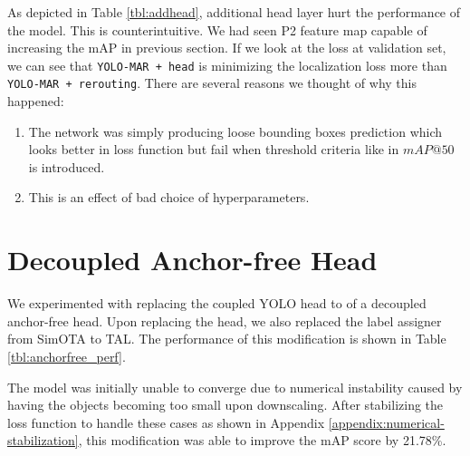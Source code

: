 \begin{table}
  \centering
  \label{tbl:addhead}
  \vspace{-1ex}
  
\end{table}

As depicted in Table \ref{tbl:addhead}, additional head layer hurt the performance of the model.
This is counterintuitive. We had seen P2 feature map capable of increasing the mAP in previous section.
If we look at the loss at validation set, we can see that \verb|YOLO-MAR + head| is 
minimizing the localization loss more than \verb|YOLO-MAR + rerouting|.
There are several reasons we thought of why this happened:
\begin{enumerate}
  \item The network was simply producing loose bounding boxes prediction which looks better in loss function
  but fail when threshold criteria like in $mAP@50$ is introduced.

  \item This is an effect of bad choice of hyperparameters.
\end{enumerate}


\section{Decoupled Anchor-free Head}
We experimented with replacing the coupled YOLO head to of a decoupled anchor-free head.
Upon replacing the head, we also replaced the label assigner from SimOTA to TAL.
The performance of this modification is shown in Table \ref{tbl:anchorfree_perf}.

The model was initially unable to converge due to numerical instability caused by having the objects becoming too small upon downscaling.
After stabilizing the loss function to handle these cases as shown in Appendix \ref{appendix:numerical-stabilization}, 
this modification was able to improve the mAP score by 21.78\%.

